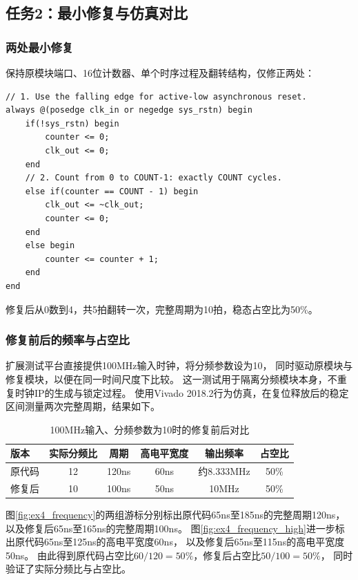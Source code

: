 \subsection{任务2：最小修复与仿真对比}
\subsubsection{两处最小修复}

保持原模块端口、16位计数器、单个时序过程及翻转结构，仅修正两处：
\begin{lstlisting}[style=vcode,caption={偶数分频的两处最小修复}]
// 1. Use the falling edge for active-low asynchronous reset.
always @(posedge clk_in or negedge sys_rstn) begin
    if(!sys_rstn) begin
        counter <= 0;
        clk_out <= 0;
    end
    // 2. Count from 0 to COUNT-1: exactly COUNT cycles.
    else if(counter == COUNT - 1) begin
        clk_out <= ~clk_out;
        counter <= 0;
    end
    else begin
        counter <= counter + 1;
    end
end
\end{lstlisting}
修复后从0数到4，共5拍翻转一次，完整周期为10拍，稳态占空比为50\%。

\subsubsection{修复前后的频率与占空比}

扩展测试平台直接提供100MHz输入时钟，将分频参数设为10，
同时驱动原模块与修复模块，以便在同一时间尺度下比较。
这一测试用于隔离分频模块本身，不重复时钟IP的生成与锁定过程。
使用Vivado 2018.2行为仿真，在复位释放后的稳定区间测量两次完整周期，结果如下。

\begin{table}[H]
\centering
\caption{100MHz输入、分频参数为10时的修复前后对比}
\begin{tabular}{lccccc}
\toprule
版本 & 实际分频比 & 周期 & 高电平宽度 & 输出频率 & 占空比\\
\midrule
原代码 & 12 & 120ns & 60ns & 约8.333MHz & 50\%\\
修复后 & 10 & 100ns & 50ns & 10MHz & 50\%\\
\bottomrule
\end{tabular}
\end{table}

图\ref{fig:ex4_frequency}的两组游标分别标出原代码65ns至185ns的完整周期120ns，
以及修复后65ns至165ns的完整周期100ns。
图\ref{fig:ex4_frequency_high}进一步标出原代码65ns至125ns的高电平宽度60ns，
以及修复后65ns至115ns的高电平宽度50ns。
由此得到原代码占空比$60/120=50\%$，修复后占空比$50/100=50\%$，
同时验证了实际分频比与占空比。

